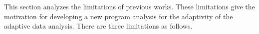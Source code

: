 This section analyzes the limitations of previous works. These limitations give the motivation for developing a new
program analysis for the adaptivity of the adaptive data analysis.
There are three limitations as follows.

